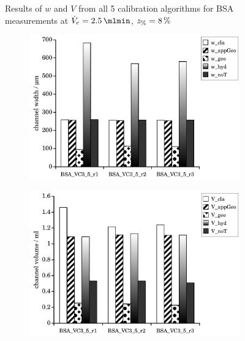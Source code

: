 \begin{figure}[htp]
\begin{center}
\begin{subfigure}{\subFigSize}
    \end{subfigure}
  \end{center}
  \vspace*{-4ex}    
  \caption[Results of $w$ and $V$ from all 5 calibration algorithms for BSA measurements at
  $\Vc = \SI{2.5}{\mlmin}$, $\zP = \SI{8}{\percent}$]{
    Results of $w$ and $V$ from all 5 calibration algorithms for BSA measurements at
    $\Vc = \SI{2.5}{\mlmin}$, $\zP = \SI{8}{\percent}$
  }
  \label{fig:calibRes_BSA_VC2_5}
\end{figure}  
\begin{figure}[htp]
  \begin{center}
    \begin{subfigure}{\subFigSize}
      \includegraphics[width=\linewidth]{./images/data/eval_own_p8/calibW_BSA_VC_3_5_p8.pdf}
    \end{subfigure}
    \begin{subfigure}{\subFigSize}
      \includegraphics[width=\linewidth]{./images/data/eval_own_p8/calibV_BSA_VC_3_5_p8.pdf}

\end{subfigure}
\end{center}
\end{figure}
